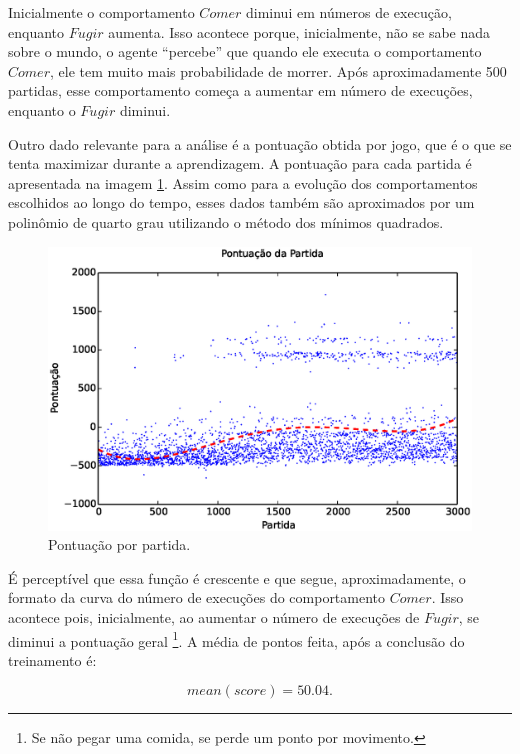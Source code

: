 Inicialmente o comportamento $ Comer $ diminui em números de execução, enquanto $ Fugir $ aumenta. Isso acontece porque, inicialmente, não se sabe nada sobre o mundo, o agente ``percebe'' que quando ele executa o comportamento $ Comer $, ele tem muito mais probabilidade de morrer. Após aproximadamente 500 partidas, esse comportamento começa a aumentar em número de execuções, enquanto o $ Fugir $ diminui.

Outro dado relevante para a análise é a pontuação obtida por jogo, que é o que se tenta maximizar durante a aprendizagem. A pontuação para cada partida é apresentada na imagem \ref{img:3ComportamentosMapaPequeno:PontuacaoPorPartida}. Assim como para a evolução dos comportamentos escolhidos ao longo do tempo, esses dados também são aproximados por um polinômio de quarto grau utilizando o método dos mínimos quadrados.

\begin{figure}[h]
    \centering
    \includegraphics[width=\linewidth]{images/3_behaviors_small_map/match_scores____pol}
    \caption{Pontuação por partida.}
    \label{img:3ComportamentosMapaPequeno:PontuacaoPorPartida}
\end{figure}

É perceptível que essa função é crescente e que segue, aproximadamente, o formato da curva do número de execuções do comportamento $ Comer $. Isso acontece pois, inicialmente, ao aumentar o número de execuções de $ Fugir $, se diminui a pontuação geral%
\footnote{Se não pegar uma comida, se perde um ponto por movimento.%
}. A média de pontos feita, após a conclusão do treinamento é:

$$ mean \left( score \right) =50.04. $$

